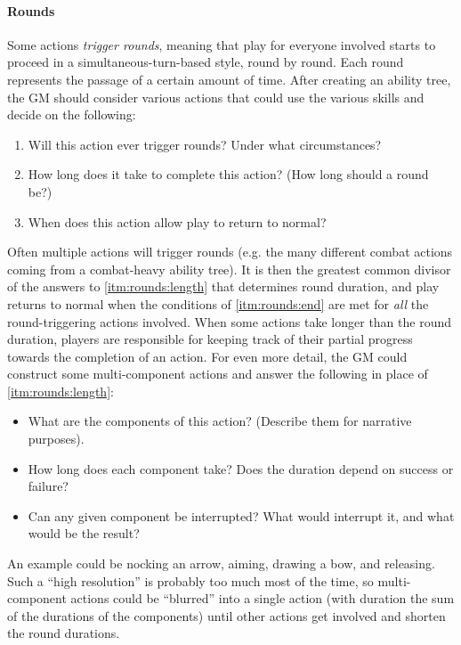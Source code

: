 \documentclass[12pt]{article}
\begin{document}
\paragraph{Rounds}
Some actions \emph{trigger rounds},
meaning that play for everyone involved starts to proceed in a simultaneous-turn-based style,
round by round.
Each round represents the passage of a certain amount of time.
After creating an ability tree, the GM should consider various actions
that could use the various skills and decide on the following:
\vspace{-1em}
\begin{enumerate}
\item\label{itm:rounds:trigger}
Will this action ever trigger rounds? Under what circumstances?
\item\label{itm:rounds:length}
How long does it take to complete this action? (How long should a round be?)
\item\label{itm:rounds:end}
When does this action allow play to return to normal?
\end{enumerate}
Often multiple actions will trigger rounds 
(e.g. the many different combat actions coming from a combat-heavy ability tree).
It is then the greatest common divisor of the answers to \ref{itm:rounds:length} that determines round duration,
and play returns to normal when the conditions of \ref{itm:rounds:end} are met for \emph{all} the round-triggering actions involved.
When some actions take longer than the round duration, players are responsible for keeping track of their partial progress towards
the completion of an action.
For even more detail, the GM could construct some multi-component actions and answer the following in place of \ref{itm:rounds:length}:
\vspace{-1em}
\begin{itemize}
\item What are the components of this action? (Describe them for narrative purposes).
\item How long does each component take? Does the duration depend on success or failure?
\item Can any given component be interrupted? What would interrupt it, and what would be the result?
\end{itemize}
An example could be nocking an arrow, aiming, drawing a bow, and releasing.
Such a ``high resolution'' is probably too much most of the time, so multi-component actions could be ``blurred'' into a single
action (with duration the sum of the durations of the components) until other actions get involved and shorten the round durations.
\end{document}
